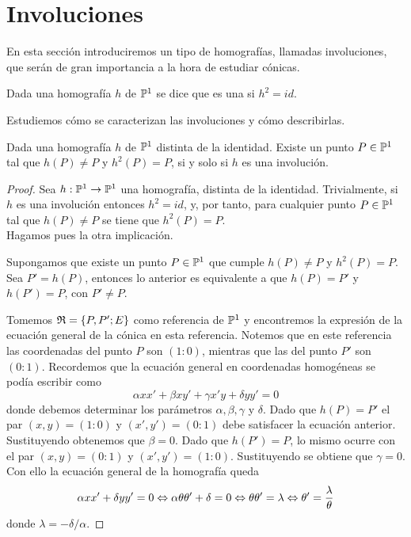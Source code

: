 \section{Involuciones}
En esta sección introduciremos un tipo de homografías, llamadas involuciones, que serán de gran importancia a la hora de estudiar cónicas.
\begin{defi}
	Dada una homografía $h$ de $\mathbb{P}^1$ se dice que es una  si $h^2=id$.
\end{defi}
Estudiemos cómo se caracterizan las involuciones y cómo describirlas.
\begin{lem}
	Dada una homografía $h$ de $\mathbb{P}^1$ distinta de la identidad. Existe un punto $P\in\mathbb{P}^1$ tal que $h(P)\not=P$ y $h^2(P)=P$, si y solo si $h$ es una involución.
\end{lem}
\begin{proof}
	Sea $h:\mathbb{P}^1\rightarrow\mathbb{P}^1$ una homografía, distinta de la identidad. Trivialmente, si $h$ es una involución entonces $h^2=id$, y, por tanto, para cualquier punto $P\in\mathbb{P}^1$ tal que $h(P)\not=P$ se tiene que $h^2(P)=P$.\\
	
	Hagamos pues la otra implicación.
	
	Supongamos que existe un punto $P\in\mathbb{P}^1$ que cumple $h(P)\not=P$ y $h^2(P)=P$. Sea $P'=h(P)$, entonces lo anterior es equivalente a que $h(P)=P'$ y $h(P')=P$, con $P'\not=P$.
	
	Tomemos $\mathfrak{R}=\{P,P';E\}$ como referencia de $\mathbb{P}^1$ y encontremos la expresión de la ecuación general de la cónica en esta referencia. Notemos que en este referencia las coordenadas del punto $P$ son $(1:0)$, mientras que las del punto $P'$ son $(0:1)$. Recordemos que la ecuación general en coordenadas homogéneas se podía escribir como
	\begin{equation*}
		\alpha xx'+\beta xy'+\gamma x'y+\delta yy'=0
	\end{equation*}
	donde debemos determinar los parámetros $\alpha,\beta,\gamma$ y $\delta$. Dado que $h(P)=P'$ el par $(x,y)=(1:0)$ y $(x',y')=(0:1)$ debe satisfacer la ecuación anterior. Sustituyendo obtenemos que $\beta=0$. Dado que $h(P')=P$, lo mismo ocurre con el par $(x,y)=(0:1)$ y $(x',y')=(1:0)$. Sustituyendo se obtiene que $\gamma=0$. Con ello la ecuación general de la homografía queda
	\begin{equation*}
		\alpha xx'+\delta yy'=0\Leftrightarrow \alpha\theta\theta'+\delta=0\Leftrightarrow \theta\theta'=\lambda\Leftrightarrow \theta'=\frac{\lambda}{\theta}
	\end{equation*}
	donde $\lambda=-\delta/\alpha$. 
	

\end{proof}
